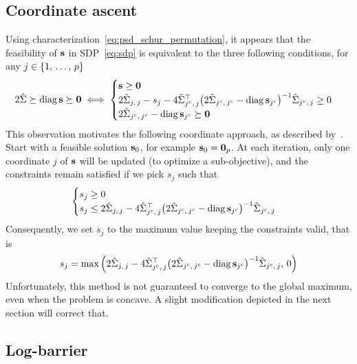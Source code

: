 \subsection{Coordinate ascent}\label{subsec:coordinate_ascent}

Using characterization~\ref{eq:psd_schur_permutation},
it appears that the feasibility of $\mathbf{s}$ in SDP~\ref{eq:sdp} is equivalent to the three following conditions,
for any $j \in \left\{ 1,\, \dots,\, p \right\}$
\begin{equation}\label{eq:schur_sdp_constraints}
    2\hat{\Sigma} \succeq \operatorname*{diag} \mathbf{s} \succeq \mathbf{0}
    \iff
    \begin{cases}
        \mathbf{s} \geq \mathbf{0}\\
        2\hat{\Sigma}_{j,\, j} - s_j
            - 4\hat{\Sigma}_{j^c,\, j}^\top\big( 2\hat{\Sigma}_{j^c,\, j^c} - \operatorname*{diag} \mathbf{s}_{j^c} \big)^{-1}\hat{\Sigma}_{j^c,\, j} \geq 0\\
        2\hat{\Sigma}_{j^c,\, j^c} - \operatorname*{diag} \mathbf{s}_{j^c} \succeq \mathbf{0}
    \end{cases}
\end{equation}
This observation motivates the following coordinate approach, as described by~\cite{block_coordinate_sdp}.
Start with a feasible solution $\mathbf{s}_0$, for example $\mathbf{s}_0 = \mathbf{0}_p$.
At each iteration, only one coordinate $j$ of $\mathbf{s}$ will be updated (to optimize a sub-objective),
and the constraints remain satisfied if we pick $s_j$ such that
\begin{equation}\label{eq:sdp_simple_constraints}
    \begin{cases}
        s_j \geq 0\\
        s_j \leq 2\hat{\Sigma}_{j,\, j}
            - 4\hat{\Sigma}_{j^c,\, j}^\top\big( 2\hat{\Sigma}_{j^c,\, j^c} - \operatorname*{diag} \mathbf{s}_{j^c} \big)^{-1}\hat{\Sigma}_{j^c,\, j}
    \end{cases}
\end{equation}
Consequently, we set $s_j$ to the maximum value keeping the constraints valid,
that is
\begin{equation*}
s_j = \max\Big( 2\hat{\Sigma}_{j,\, j}
    - 4\hat{\Sigma}_{j^c,\, j}^\top\big( 2\hat{\Sigma}_{j^c,\, j^c} - \operatorname*{diag} \mathbf{s}_{j^c} \big)^{-1}\hat{\Sigma}_{j^c,\, j}
    ,\, 0 \Big)
\end{equation*}
Unfortunately, this method is not guaranteed to converge to the global maximum, even when the problem is concave.
A slight modification depicted in the next section will correct that.

\subsection{Log-barrier}\label{subsec:log_barrier}

